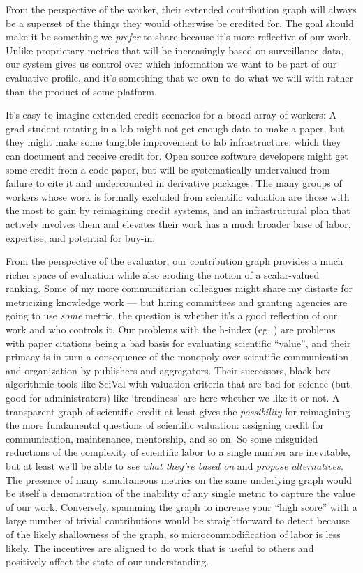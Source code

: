 From the perspective of the worker, their extended contribution graph
will always be a superset of the things they would otherwise be credited
for. The goal should make it be something we \emph{prefer} to share
because it's more reflective of our work. Unlike proprietary metrics
that will be increasingly based on surveillance data, our system gives
us control over which information we want to be part of our evaluative
profile, and it's something that we own to do what we will with rather
than the product of some platform.

It's easy to imagine extended credit scenarios for a broad array of
workers: A grad student rotating in a lab might not get enough data to
make a paper, but they might make some tangible improvement to lab
infrastructure, which they can document and receive credit for. Open
source software developers might get some credit from a code paper, but
will be systematically undervalued from failure to cite it and
undercounted in derivative packages. The many groups of workers whose
work is formally excluded from scientific valuation are those with the
most to gain by reimagining credit systems, and an infrastructural plan
that actively involves them and elevates their work has a much broader
base of labor, expertise, and potential for buy-in.

From the perspective of the evaluator, our contribution graph provides a
much richer space of evaluation while also eroding the notion of a
scalar-valued ranking. Some of my more communitarian colleagues might
share my distaste for metricizing knowledge work --- but hiring
committees and granting agencies are going to use \emph{some} metric,
the question is whether it's a good reflection of our work and who
controls it. Our problems with the h-index (eg. \citep{teixeiradasilvaMultipleVersionsHindex2018, costasReflectionsCautionaryUse2018} ) are problems with paper
citations being a bad basis for evaluating scientific ``value'', and
their primacy is in turn a consequence of the monopoly over scientific
communication and organization by publishers and aggregators. Their
successors, black box algorithmic tools like SciVal with valuation
criteria that are bad for science (but good for administrators) like
`trendiness' are here whether we like it or not. A transparent graph of
scientific credit at least gives the \emph{possibility} for reimagining
the more fundamental questions of scientific valuation: assigning credit
for communication, maintenance, mentorship, and so on. So some misguided
reductions of the complexity of scientific labor to a single number are
inevitable, but at least we'll be able to \emph{see what they're based
on} and \emph{propose alternatives.} The presence of many simultaneous
metrics on the same underlying graph would be itself a demonstration of
the inability of any single metric to capture the value of our work.
Conversely, spamming the graph to increase your ``high score'' with a
large number of trivial contributions would be straightforward to detect
because of the likely shallowness of the graph, so microcommodification
of labor is less likely. The incentives are aligned to do work that is
useful to others and positively affect the state of our understanding.

